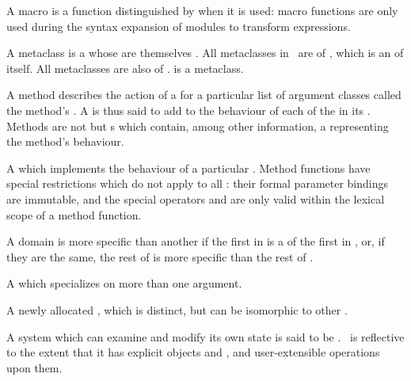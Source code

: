 \begin{optDefinition}
\begin{definitions}
     A macro is a function distinguished
    by when it is used: macro functions are only used during the syntax
    expansion of modules to transform expressions.

      A metaclass is a
      whose  are themselves .
    All metaclasses in \eulisp\ are  of , which is
    an  of itself.  All metaclasses are also  of
    .   is a metaclass.

      A method describes the action of
    a  for a particular list of argument classes
    called the method's .  A  is thus said to add to the
    behaviour of each of the  in its .  Methods are not
     but s which contain, among other information, a
     representing the method's behaviour.

      A
     which implements the behaviour of a particular .
    Method functions have special restrictions which do not apply to all
    : their formal parameter bindings are immutable, and the
    special operators  and 
    are only valid within the lexical scope of a method function.

     
     A domain  is more
    specific than another  if the first  in
     is a  of the first  in
    , or, if they are the same, the rest of  is
    more specific than the rest of .

      A  which
    specializes on more than one argument.

     A newly allocated
    , which is distinct, but can be isomorphic to other
    .

      A system which can
    examine and modify its own state is said to be .  \eulisp\
    is reflective to the extent that it has explicit  objects and
    \sc{metaclasses}, and user-extensible operations upon them.


\end{definitions}
\end{optDefinition}
